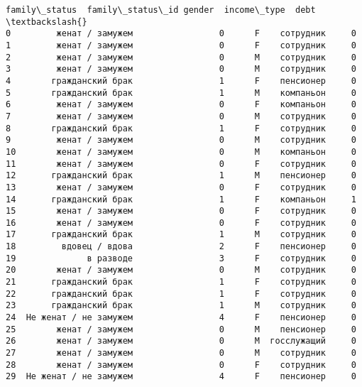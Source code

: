 \documentclass[11pt]{article}
\begin{document}
\begin{tcolorbox}[breakable, boxrule=.5pt, size=fbox, pad at break*=1mm, opacityfill=0]
\begin{Verbatim}[commandchars=\\\{\}]
            family\_status  family\_status\_id gender  income\_type  debt  \textbackslash{}
0         женат / замужем                 0      F    сотрудник     0
1         женат / замужем                 0      F    сотрудник     0
2         женат / замужем                 0      M    сотрудник     0
3         женат / замужем                 0      M    сотрудник     0
4        гражданский брак                 1      F    пенсионер     0
5        гражданский брак                 1      M    компаньон     0
6         женат / замужем                 0      F    компаньон     0
7         женат / замужем                 0      M    сотрудник     0
8        гражданский брак                 1      F    сотрудник     0
9         женат / замужем                 0      M    сотрудник     0
10        женат / замужем                 0      M    компаньон     0
11        женат / замужем                 0      F    сотрудник     0
12       гражданский брак                 1      M    пенсионер     0
13        женат / замужем                 0      F    сотрудник     0
14       гражданский брак                 1      F    компаньон     1
15        женат / замужем                 0      F    сотрудник     0
16        женат / замужем                 0      F    сотрудник     0
17       гражданский брак                 1      M    сотрудник     0
18         вдовец / вдова                 2      F    пенсионер     0
19              в разводе                 3      F    сотрудник     0
20        женат / замужем                 0      M    сотрудник     0
21       гражданский брак                 1      F    сотрудник     0
22       гражданский брак                 1      F    сотрудник     0
23       гражданский брак                 1      M    сотрудник     0
24  Не женат / не замужем                 4      F    пенсионер     0
25        женат / замужем                 0      M    пенсионер     0
26        женат / замужем                 0      M  госслужащий     0
27        женат / замужем                 0      M    сотрудник     0
28        женат / замужем                 0      F    сотрудник     0
29  Не женат / не замужем                 4      F    пенсионер     0


\end{Verbatim}
\end{tcolorbox}
\end{document}

